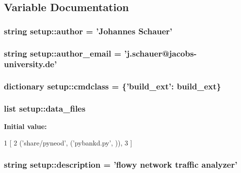 \subsection{\-Variable \-Documentation}
\hypertarget{namespacesetup_a7b92894168460f935bc49467954c4a92}{
\subsubsection[{author}]{\setlength{\rightskip}{0pt plus 5cm}string {\bf setup\-::author} = '\-Johannes \-Schauer'}}\label{namespacesetup_a7b92894168460f935bc49467954c4a92}
\hypertarget{namespacesetup_a4ead8e1ca45242906fde7d5489f3beaa}{
\subsubsection[{author\-\_\-email}]{\setlength{\rightskip}{0pt plus 5cm}string {\bf setup\-::author\-\_\-email} = 'j.\-schauer@jacobs-\/university.\-de'}}\label{namespacesetup_a4ead8e1ca45242906fde7d5489f3beaa}
\hypertarget{namespacesetup_acba4bbef35b8f6cac96432395d7564a4}{
\subsubsection[{cmdclass}]{\setlength{\rightskip}{0pt plus 5cm}dictionary {\bf setup\-::cmdclass} = \{'build\-\_\-ext'\-: build\-\_\-ext\}}}\label{namespacesetup_acba4bbef35b8f6cac96432395d7564a4}
\hypertarget{namespacesetup_a7c31b01320c210cfb3363c7e4c264eac}{
\subsubsection[{data\-\_\-files}]{\setlength{\rightskip}{0pt plus 5cm}list {\bf setup\-::data\-\_\-files}}}\label{namespacesetup_a7c31b01320c210cfb3363c7e4c264eac}
{\bfseries \-Initial value\-:}
\begin{DoxyCode}
1 [
2         ('share/pyneod', ('pybankd.py', )),
3         ]
\end{DoxyCode}
\hypertarget{namespacesetup_a4ad612547892c74be7035043265eb65c}{
\subsubsection[{description}]{\setlength{\rightskip}{0pt plus 5cm}string {\bf setup\-::description} = 'flowy network traffic analyzer'}}\label{namespacesetup_a4ad612547892c74be7035043265eb65c}
